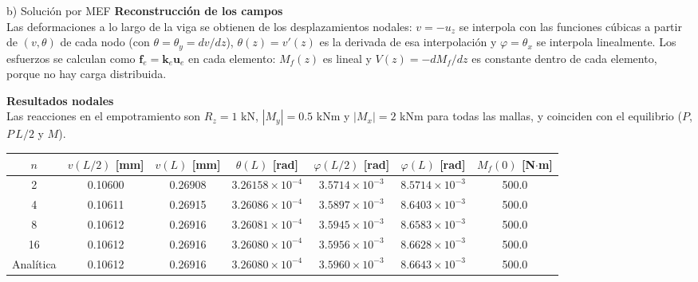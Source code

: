 \begin{desarrollo}{b) Solución por MEF}
\textbf{Reconstrucción de los campos}\\
Las deformaciones a lo largo de la viga se obtienen de los desplazamientos nodales:
$v=-u_z$ se interpola con las funciones cúbicas a partir de
$(v,\theta)$ de cada nodo (con $\theta=\theta_y=dv/dz$),
$\theta(z)=v'(z)$ es la derivada de esa interpolación y $\varphi=\theta_x$
se interpola linealmente. Los esfuerzos se calculan como
$\mathbf{f}_e=\mathbf{k}_e\mathbf{u}_e$ en cada elemento: $M_f(z)$ es lineal y
$V(z)=-dM_f/dz$ es constante dentro de cada elemento, porque no hay carga
distribuida.

\textbf{Resultados nodales}\\
Las reacciones en el empotramiento son $R_z=1$ kN, $|M_y|=0.5$ kNm y
$|M_x|=2$ kNm para todas las mallas, y coinciden con el equilibrio
($P$, $P\,L/2$ y $M$).
\begin{center}
\renewcommand{\arraystretch}{1.2}
\small\setlength{\tabcolsep}{4pt}
\begin{tabular}{ccccccc}
\hline
$n$ & $v(L/2)$ [mm] & $v(L)$ [mm] & $\theta(L)$ [rad] & $\varphi(L/2)$ [rad] & $\varphi(L)$ [rad] & $M_f(0)$ [N$\cdot$m]\\
\hline
2  & 0.10600 & 0.26908 & $3.26158\times10^{-4}$ & $3.5714\times10^{-3}$ & $8.5714\times10^{-3}$ & 500.0\\
4  & 0.10611 & 0.26915 & $3.26086\times10^{-4}$ & $3.5897\times10^{-3}$ & $8.6403\times10^{-3}$ & 500.0\\
8  & 0.10612 & 0.26916 & $3.26081\times10^{-4}$ & $3.5945\times10^{-3}$ & $8.6583\times10^{-3}$ & 500.0\\
16 & 0.10612 & 0.26916 & $3.26080\times10^{-4}$ & $3.5956\times10^{-3}$ & $8.6628\times10^{-3}$ & 500.0\\
\hline
Analítica & 0.10612 & 0.26916 & $3.26080\times10^{-4}$ & $3.5960\times10^{-3}$ & $8.6643\times10^{-3}$ & 500.0\\
\hline
\end{tabular}
\end{center}

\end{desarrollo}


